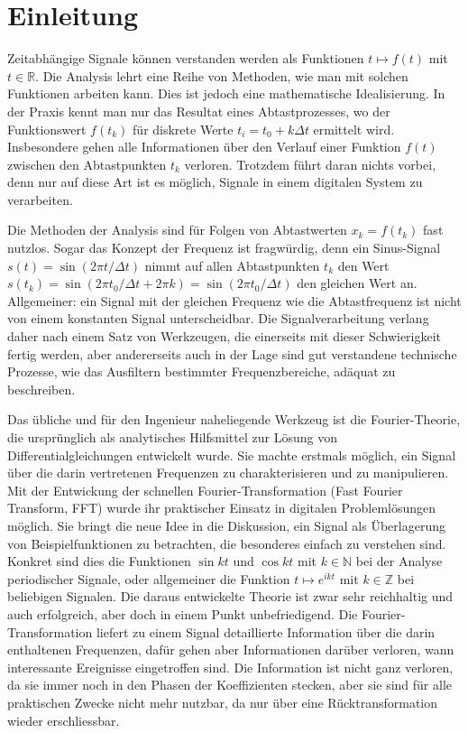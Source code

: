 %
%
%
\chapter*{Einleitung\label{chapter:einleitung}}
Zeitabhängige Signale können verstanden werden als Funktionen $t\mapsto f(t)$
mit $t\in\mathbb R$.
Die Analysis lehrt eine Reihe von Methoden, wie man mit solchen
Funktionen arbeiten kann.
Dies ist jedoch eine mathematische Idealisierung.
In der Praxis kennt man nur das Resultat eines Abtastprozesses, wo
der Funktionswert $f(t_k)$ für diskrete Werte $t_i=t_0 + k\Delta t$
ermittelt wird.
Insbesondere gehen alle Informationen über den Verlauf einer Funktion $f(t)$
zwischen den Abtastpunkten $t_k$ verloren.
Trotzdem führt daran nichts vorbei, denn nur auf diese Art ist es möglich,
Signale in einem digitalen System zu verarbeiten.

Die Methoden der Analysis sind für Folgen von Abtastwerten $x_k=f(t_k)$
fast nutzlos.
Sogar das Konzept der Frequenz ist fragwürdig, denn ein Sinus-Signal
$s(t)=\sin(2\pi t/\Delta t)$ nimmt auf allen Abtastpunkten $t_k$
den Wert $s(t_k)=\sin(2\pi t_0/\Delta t+2\pi k)=\sin(2\pi t_0/\Delta t)$
den gleichen Wert an.
Allgemeiner: ein Signal mit der gleichen Frequenz wie die Abtastfrequenz
ist nicht von einem konstanten Signal unterscheidbar.
Die Signalverarbeitung verlang daher nach einem Satz von Werk\-zeugen, die
einerseits mit dieser Schwierigkeit fertig werden, aber andererseits auch
in der Lage sind gut verstandene technische Prozesse, wie das Ausfiltern
bestimmter Frequenzbereiche, adäquat zu beschreiben.

Das übliche und für den Ingenieur naheliegende Werkzeug ist die 
Fourier-Theorie, die ursprünglich als analytisches Hilfsmittel zur Lösung
von Differentialgleichungen entwickelt wurde.
Sie machte erstmals möglich, ein Signal über die darin vertretenen
Frequenzen zu charakterisieren und zu manipulieren.
Mit der Entwickung der schnellen Fourier-Transformation
(Fast Fourier Transform, FFT) wurde ihr praktischer Einsatz in digitalen
Problemlösungen möglich.
Sie bringt die neue Idee in die Diskussion, ein Signal als Überlagerung
von Beispielfunktionen zu betrachten, die besonderes einfach zu
verstehen sind.
Konkret sind dies die Funktionen $\sin kt$ und $\cos kt$ mit
$k\in\mathbb N$ bei der Analyse periodischer Signale,
oder allgemeiner die Funktion $t\mapsto e^{ikt}$ mit $k\in\mathbb Z$
bei beliebigen Signalen.
Die daraus entwickelte Theorie ist zwar sehr reichhaltig und auch erfolgreich,
aber doch in einem Punkt unbefriedigend.
Die Fourier-Transformation liefert zu einem Signal detaillierte Information
über die darin enthaltenen Frequenzen, dafür gehen aber Informationen
darüber verloren, wann interessante Ereignisse eingetroffen sind.
Die Information ist nicht ganz verloren, da sie immer noch in den Phasen
der Koeffizienten stecken, aber sie sind für alle praktischen Zwecke 
nicht mehr nutzbar, da nur über eine Rücktransformation wieder erschliessbar.

